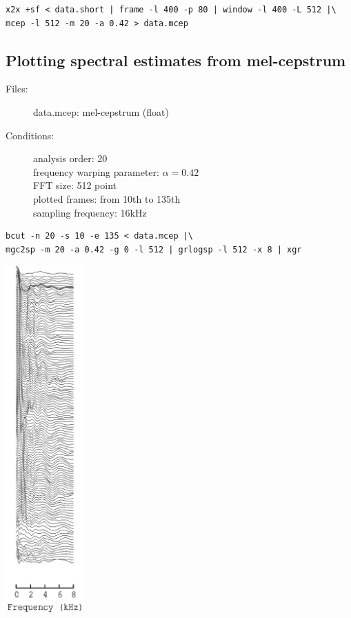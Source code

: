 \documentclass[a4paper]{article}
\begin{document}
\begin{verbatim}
x2x +sf < data.short | frame -l 400 -p 80 | window -l 400 -L 512 |\
mcep -l 512 -m 20 -a 0.42 > data.mcep
\end{verbatim}

\subsection{Plotting spectral estimates from mel-cepstrum}

\begin{description}
\item[Files:]
  data.mcep: mel-cepstrum (float)
\item[Conditions:]
  analysis order: 20\\
  frequency warping parameter: $\alpha = 0.42$\\
  FFT size: 512 point\\
  plotted frames: from 10th to 135th\\
  sampling frequency: 16kHz
\end{description}

\begin{verbatim}
bcut -n 20 -s 10 -e 135 < data.mcep |\
mgc2sp -m 20 -a 0.42 -g 0 -l 512 | grlogsp -l 512 -x 8 | xgr
\end{verbatim}

\includegraphics[width=3cm]{data.mcep.grlogsp.eps}
\end{document}
